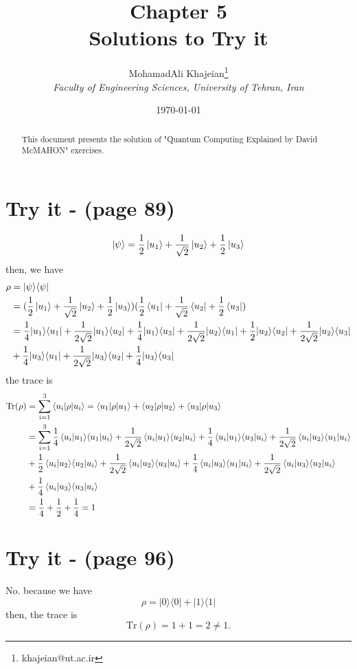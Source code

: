 \documentclass{article}
\title{\textbf{Chapter 5} \\ \small Solutions to Try it}
\author{
    MohamadAli Khajeian\footnote{khajeian@ut.ac.ir} \\ 
    \small \textit{Faculty of Engineering Sciences, University of Tehran, Iran} \\ 
}
\date{\today}
\newcommand{\op}[2]{|#1\rangle \langle#2|}
\newcommand{\sand}[3]{\braket{#1 | #2 | #3}}
\newcommand{\sandop}[3]{\braket{#1 #2 #3}}
\begin{document}
\maketitle

\begin{abstract}
    This document presents the solution of "Quantum Computing Explained by David McMAHON" exercises.
\end{abstract}

\section*{Try it - (page 89)}
\begin{equation*}
   \ket{\psi} = \frac{1}{2}\ket{u_1} + \frac{1}{\sqrt{2}}\ket{u_2} + \frac{1}{2}\ket{u_3}
\end{equation*}
then, we have
\begin{align*}
   \rho &= \op{\psi}{\psi} \\ 
   &= (\frac{1}{2}\ket{u_1} + \frac{1}{\sqrt{2}}\ket{u_2} + \frac{1}{2}\ket{u_3})(\frac{1}{2}\bra{u_1} + \frac{1}{\sqrt{2}}\bra{u_2} + \frac{1}{2}\bra{u_3}) \\
   &= \frac{1}{4}\op{u_1}{u_1} + \frac{1}{2\sqrt{2}}\op{u_1}{u_2} + \frac{1}{4}\op{u_1}{u_3} + \frac{1}{2\sqrt{2}}\op{u_2}{u_1} + \frac{1}{2}\op{u_2}{u_2}
   + \frac{1}{2\sqrt{2}}\op{u_2}{u_3} \\
   &+ \frac{1}{4}\op{u_3}{u_1} + \frac{1}{2\sqrt{2}}\op{u_3}{u_2} + \frac{1}{4}\op{u_3}{u_3}
\end{align*}
the trace is
\begin{align*}
   \text{Tr}(\rho) &= \sum_{i=1}^{3} \sand{u_i}{\rho}{u_i} = \sand{u_1}{\rho}{u_1} + \sand{u_2}{\rho}{u_2} + \sand{u_3}{\rho}{u_3} \\
   &= \sum_{i=1}^{3} \frac{1}{4}\sandop{u_i}{\op{u_1}{u_1}}{u_i} + \frac{1}{2\sqrt{2}}\sandop{u_i}{\op{u_1}{u_2}}{u_i} + \frac{1}{4}\sandop{u_i}{\op{u_1}{u_3}}{u_i} + \frac{1}{2\sqrt{2}}\sandop{u_i}{\op{u_2}{u_1}}{u_i} \\
   &+ \frac{1}{2}\sandop{u_i}{\op{u_2}{u_2}}{u_i} + \frac{1}{2\sqrt{2}}\sandop{u_i}{\op{u_2}{u_3}}{u_i} + \frac{1}{4}\sandop{u_i}{\op{u_3}{u_1}}{u_i} + \frac{1}{2\sqrt{2}}\sandop{u_i}{\op{u_3}{u_2}}{u_i} \\
   &+ \frac{1}{4}\sandop{u_i}{\op{u_3}{u_3}}{u_i} \\
   &= \frac{1}{4} + \frac{1}{2} + \frac{1}{4} = 1
\end{align*}
\section*{Try it - (page 96)}
No. because we have
\begin{equation*}
   \rho = \op{0}{0} + \op{1}{1}
\end{equation*}
then, the trace is
\begin{equation*}
   \text{Tr}(\rho) = 1 + 1 = 2 \neq 1.
\end{equation*}
\end{document}
